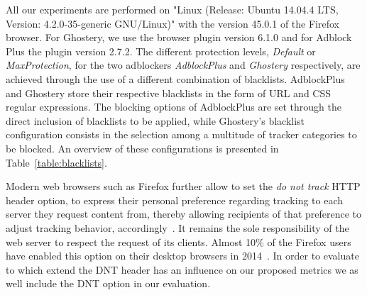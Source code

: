 \documentclass[compsoc, conference, letterpaper, 10pt, times]{IEEEtran}
\begin{document}
All our experiments are performed on "Linux (Release: Ubuntu 14.04.4 LTS, Version: 4.2.0-35-generic GNU/Linux)" with the version 45.0.1 of the Firefox browser. For Ghostery, we use the browser plugin version 6.1.0 and for Adblock Plus the plugin version 2.7.2.
The different protection levels, \textit{Default} or \textit{MaxProtection}, for the two adblockers \textit{AdblockPlus} and \textit{Ghostery} respectively, are achieved through the use of a different combination of blacklists. AdblockPlus and Ghostery store their respective blacklists in the form of URL and CSS regular expressions. The blocking options of AdblockPlus are set through the direct inclusion of blacklists to be applied, while  Ghostery's blacklist configuration consists in the selection among a multitude of tracker categories to be blocked. An overview of these configurations is presented in Table~\ref{table:blacklists}.








Modern web browsers such as Firefox further allow to set the \emph{do not track} HTTP header option, to express their personal preference regarding tracking to each server they request content from, thereby allowing recipients of that preference to adjust tracking behavior, accordingly~\cite{dnt}. It remains the sole responsibility of the web server to respect the request of its clients. Almost 10\% of the Firefox users have enabled this option on their desktop browsers in 2014~\cite{dnt_state_firefox}. In order to evaluate to which extend the DNT header has an influence on our proposed metrics we as well include the DNT option in our evaluation.
\end{document}
